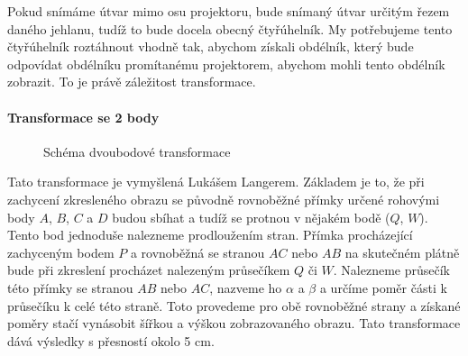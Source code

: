 \documentclass[twoside,12pt]{article}
\newcommand{\podpodsekce}[1]{\paragraph{#1}\quad\vskip 6pt}
\begin{document}
Pokud snímáme útvar mimo osu projektoru, bude snímaný útvar určitým řezem daného jehlanu, tudíž to bude docela obecný čtyřúhelník. My potřebujeme tento čtyřúhelník roztáhnout vhodně tak, abychom získali obdélník, který bude odpovídat obdélníku promítanému projektorem, abychom mohli tento obdélník zobrazit. To je právě záležitost transformace.

\podpodsekce{Transformace se 2 body}

\begin{figure}[ht]
 \begin{center}
 \end{center}
 \caption{Schéma dvoubodové transformace}
\end{figure}
Tato transformace je vymyšlená Lukášem Langerem. Základem je to, že při zachycení zkresleného obrazu se původně rovnoběžné přímky určené rohovými body $A$, $B$, $C$ a $D$ budou sbíhat a tudíž se protnou v nějakém bodě ($Q$, $W$). Tento bod jednoduše nalezneme prodloužením stran. Přímka procházející zachyceným bodem $P$ a rovnoběžná se stranou  $AC$ nebo $AB$ na skutečném plátně bude při zkreslení procházet nalezeným průsečíkem $Q$ či $W$. Nalezneme průsečík této přímky se stranou $AB$ nebo $AC$, nazveme ho $\alpha$ a $\beta$ a určíme poměr části k průsečíku k celé této straně. Toto provedeme pro obě rovnoběžné strany a získané poměry stačí vynásobit šířkou a výškou zobrazovaného obrazu. Tato transformace dává výsledky s přesností okolo 5 cm.
\end{document}
